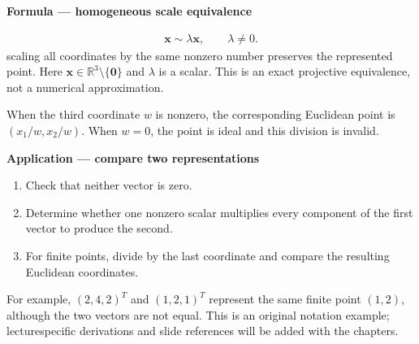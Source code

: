\documentclass[letterpaper,11pt,english,openany,oneside]{jupyterBook}
\begin{document}
\ignorespaces
\begin{TextbookBox}
\textbf{Formula — homogeneous scale equivalence}\par\smallskip
\begin{equation}\label{equation:foundations/notation:eq-homogeneous-scale}
\begin{split}\mathbf{x}\sim\lambda\mathbf{x},\qquad \lambda\ne0.\end{split}
\end{equation}
\sphinxAtStartPar
{} scaling all coordinates by the same nonzero number preserves the represented point. Here \(\mathbf{x}\in\mathbb{R}^3\setminus\{\mathbf{0}\}\) and \(\lambda\) is a scalar. This is an exact projective equivalence, not a numerical approximation.

\sphinxAtStartPar
When the third coordinate \(w\) is nonzero, the corresponding Euclidean point is \((x_1/w,x_2/w)\). When \(w=0\), the point is ideal and this division is invalid.

\end{TextbookBox}

\begin{TextbookBox}
\textbf{Application — compare two representations}\par\smallskip
\begin{enumerate}
%
\item {}
\sphinxAtStartPar
Check that neither vector is zero.

\item {}
\sphinxAtStartPar
Determine whether one nonzero scalar multiplies every component of the first vector to produce the second.

\item {}
\sphinxAtStartPar
For finite points, divide by the last coordinate and compare the resulting Euclidean coordinates.

\end{enumerate}

\sphinxAtStartPar
For example, \((2,4,2)^T\) and \((1,2,1)^T\) represent the same finite point \((1,2)\), although the two vectors are not equal. This is an original notation example; lecture\sphinxhyphen{}specific derivations and slide references will be added with the chapters.

\end{TextbookBox}
\end{document}
